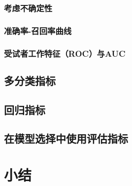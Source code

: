 \subsubsection{考虑不确定性}
\subsubsection{准确率-召回率曲线}
\subsubsection{受试者工作特征（ROC）与AUC}
\subsection{多分类指标}
\subsection{回归指标}
\subsection{在模型选择中使用评估指标}
\section{小结}